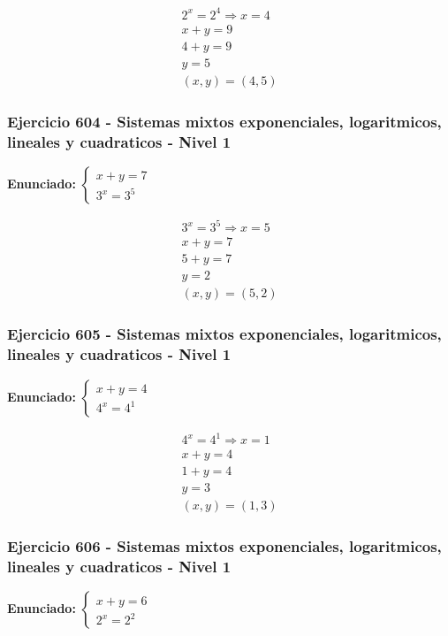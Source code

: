 \documentclass[12pt,a4paper]{article}
\begin{document}
\[
\begin{aligned}
2^x=2^{4}\Rightarrow x=4\\
x+y=9\\
4+y=9\\
y=5\\
\boxed{(x,y)=(4,5)}
\end{aligned}
\]


\subsubsection*{Ejercicio 604 - Sistemas mixtos exponenciales, logaritmicos, lineales y cuadraticos - Nivel 1}
\textbf{Enunciado:} \(\begin{cases} x+y=7\\ 3^x=3^{5}\end{cases}\)

\[
\begin{aligned}
3^x=3^{5}\Rightarrow x=5\\
x+y=7\\
5+y=7\\
y=2\\
\boxed{(x,y)=(5,2)}
\end{aligned}
\]


\subsubsection*{Ejercicio 605 - Sistemas mixtos exponenciales, logaritmicos, lineales y cuadraticos - Nivel 1}
\textbf{Enunciado:} \(\begin{cases} x+y=4\\ 4^x=4^{1}\end{cases}\)

\[
\begin{aligned}
4^x=4^{1}\Rightarrow x=1\\
x+y=4\\
1+y=4\\
y=3\\
\boxed{(x,y)=(1,3)}
\end{aligned}
\]


\subsubsection*{Ejercicio 606 - Sistemas mixtos exponenciales, logaritmicos, lineales y cuadraticos - Nivel 1}
\textbf{Enunciado:} \(\begin{cases} x+y=6\\ 2^x=2^{2}\end{cases}\)
\end{document}
